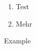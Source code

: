 \documentclass[ngerman]{exercises}
\begin{document}
    \begin{exercise}[Example]
        \begin{enumerate}[cols=2]
            \item Test
            \item Mehr
        \end{enumerate}

        \begin{solution}
            Example
        \end{solution}
    \end{exercise}
\end{document}
